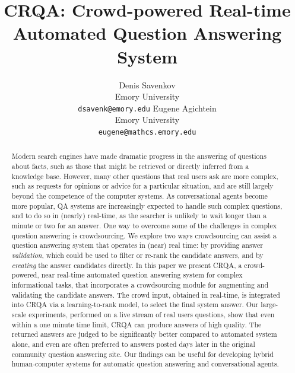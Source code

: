 \documentclass[letterpaper]{article}
\begin{document}
%
\title{CRQA: Crowd-powered Real-time Automated Question Answering System}
\author{
	Denis Savenkov\\
	Emory University\\
	\texttt{dsavenk@emory.edu}
\And
	Eugene Agichtein\\
	Emory University\\
	\texttt{eugene@mathcs.emory.edu}
}

\maketitle
\begin{abstract}
Modern search engines have made dramatic progress in the answering of questions about facts, such as those that might be retrieved or directly inferred from a knowledge base.
However, many other questions that real users ask are more complex, such as requests for opinions or advice for a particular situation, and are still largely beyond the competence of the computer systems.
As conversational agents become more popular, QA systems are increasingly expected to handle such complex questions, and to do so in (nearly) real-time, as the searcher is unlikely to wait longer than a minute or two for an answer.
One way to overcome some of the challenges in complex question answering is crowdsourcing.
We explore two ways crowdsourcing can assist a question answering system that operates in (near) real time: by providing answer {\em validation}, which could be used to filter or re-rank the candidate answers, and by {\em creating} the answer candidates directly.
In this paper we present CRQA, a crowd-powered, near real-time automated question answering system for complex informational tasks, that incorporates a crowdsourcing module for augmenting and validating the candidate answers.
The crowd input, obtained in real-time, is integrated into CRQA via a learning-to-rank model, to select the final system answer.
Our large-scale experiments, performed on a live stream of real users questions, show that even within a one minute time limit, CRQA can produce answers of high quality.
The returned answers are judged to be significantly better compared to automated system alone, and even are often preferred to answers posted days later in the original community question answering site.
Our findings can be useful for developing hybrid human-computer systems for automatic question answering and conversational agents.
\end{abstract}
\end{document}
